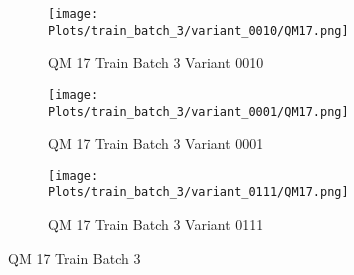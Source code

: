 \documentclass{DissertateFigs}
\begin{document}
\begin{figure}[t!]
\medskip

    \begin{subfigure}{0.43\textwidth}
    \texttt{[image: Plots/train\_batch\_3/variant\_0010/QM17.png]}
    \caption{QM 17 Train Batch 3 Variant 0010}
    \end{subfigure}
    \begin{subfigure}{0.43\textwidth}
    \texttt{[image: Plots/train\_batch\_3/variant\_0001/QM17.png]}
    \caption{QM 17 Train Batch 3 Variant 0001}
    \end{subfigure}

\medskip

    \begin{subfigure}{0.43\textwidth}
    \texttt{[image: Plots/train\_batch\_3/variant\_0111/QM17.png]}
    \caption{QM 17 Train Batch 3 Variant 0111}
    \end{subfigure}
\caption{QM 17 Train Batch 3}
    \end{figure}
\clearpage
\end{document}

